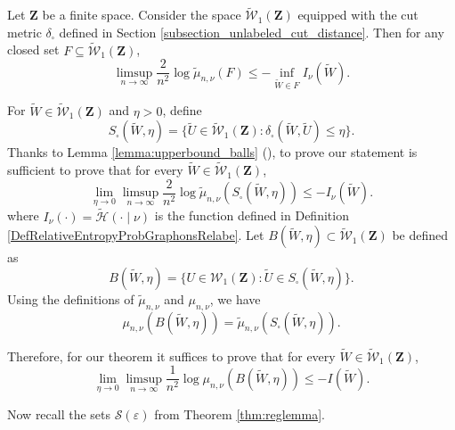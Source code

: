 \documentclass[12pt,twoside,a4paper]{article}
\newcommand{\Space}{\mathbf{Z}}
\newcommand{\Graphon}{\mathcal{W}_1}
\newcommand{\UGraphon}{\widetilde{\mathcal{W}}_1}
\begin{document}
\begin{theorem}\label{thm:upperbound}
Let $\Space$ be a finite space. Consider the space $\UGraphon(\Space)$ equipped with the cut metric $\delta_\square$ defined in Section \ref{subsection_unlabeled_cut_distance}. Then for any closed set $F \subseteq \UGraphon(\Space)$,
\[
\limsup_{n \to \infty} \frac{2}{n^2} \log \widetilde{\mu}_{n,\nu}(F) \leq -\inf_{\widetilde{W} \in F} I_{\nu}(\widetilde{W}).
\]
\end{theorem}


For $\widetilde{W} \in \UGraphon(\Space)$ and $\eta > 0$, define
\[
S_\square(\widetilde{W}, \eta) = \{ \widetilde{U} \in \UGraphon(\Space) : \delta_\square(\widetilde{W}, \widetilde{U}) \leq \eta \}.
\]
Thanks to Lemma \ref{lemma:upperbound_balls} (\cite[Lemma 4.1]{chatterjee2017large}), to prove our statement is sufficient to prove that for every $\widetilde{W} \in \UGraphon(\Space)$,
\begin{equation}\label{eq:inequalitytoprove}
\lim_{\eta \to 0} \limsup_{n \to \infty} \frac{2}{n^2} \log \widetilde{\mu}_{n,\nu}(S_\square(\widetilde{W}, \eta)) \leq - I_{\nu}(\widetilde{W}). 
\end{equation}
where $I_{\nu}(\cdot)=\widetilde{\mathcal{H}}(\cdot \mid \nu)$ is the function defined in Definition \ref{DefRelativeEntropyProbGraphonsRelabe}.
Let $B(\widetilde{W}, \eta) \subset \UGraphon(\Space)$ be defined as
\[
B(\widetilde{W}, \eta) = \{ U \in \Graphon(\Space) : \widetilde{U} \in S_\square(\widetilde{W}, \eta) \}.
\]
Using the definitions of $\widetilde{\mu}_{n,\nu}$ and $\mu_{n,\nu}$, we have
\[
\mu_{n,\nu}(B(\widetilde{W}, \eta)) = \widetilde{\mu}_{n,\nu}(S_\square(\widetilde{W}, \eta)).
\]

Therefore, for our theorem it suffices to prove that for every $\widetilde{W} \in \UGraphon(\Space)$,
\begin{equation}
\lim_{\eta \to 0} \limsup_{n \to \infty} \frac{1}{n^2} \log \mu_{n,\nu}(B(\widetilde{W}, \eta)) \leq -I(\widetilde{W}).
\end{equation}

Now recall the sets $\mathcal{S}(\varepsilon)$ from Theorem \ref{thm:reglemma}.
\end{document}
